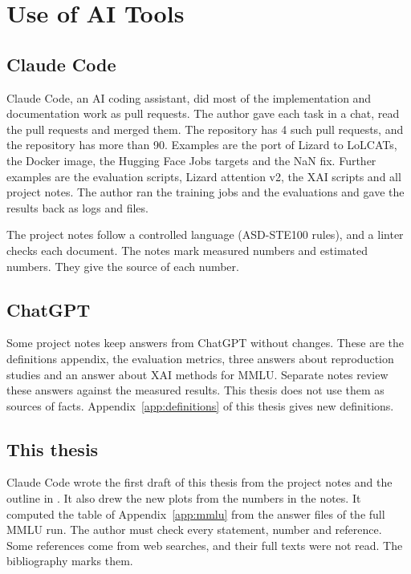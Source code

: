 \chapter{Use of AI Tools}
\label{app:ai}

\section{Claude Code}

Claude Code, an AI coding assistant, did most of the implementation and documentation work as pull requests. The author gave each task in a chat, read the pull requests and merged them. The repository  has 4 such pull requests, and the repository  has more than 90. Examples are the port of Lizard to LoLCATs, the Docker image, the Hugging Face Jobs targets and the NaN fix. Further examples are the evaluation scripts, Lizard attention v2, the XAI scripts and all project notes. The author ran the training jobs and the evaluations and gave the results back as logs and files.

The project notes follow a controlled language (ASD-STE100 rules), and a linter checks each document. The notes mark measured numbers and estimated numbers. They give the source of each number.

\section{ChatGPT}

Some project notes keep answers from ChatGPT without changes. These are the definitions appendix, the evaluation metrics, three answers about reproduction studies and an answer about XAI methods for MMLU. Separate notes review these answers against the measured results. This thesis does not use them as sources of facts. Appendix~\ref{app:definitions} of this thesis gives new definitions.

\section{This thesis}

Claude Code wrote the first draft of this thesis from the project notes and the outline in . It also drew the new plots from the numbers in the notes. It computed the table of Appendix~\ref{app:mmlu} from the answer files of the full MMLU run. The author must check every statement, number and reference. Some references come from web searches, and their full texts were not read. The bibliography marks them.
